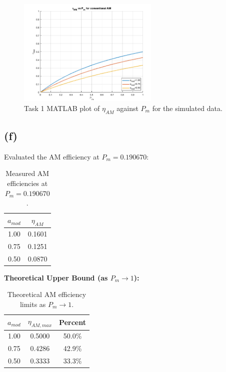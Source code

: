 \documentclass[11pt]{article}
\begin{document}
\begin{figure}[H]
  \centering
  \includegraphics[width=0.6\textwidth]{"task-1 plot.png"}
  \caption{Task 1 MATLAB plot of \(\eta_{AM}\) against \(P_m\) for the simulated data.}
\end{figure}


\subsection*{(f)}
Evaluated the AM efficiency at \( P_m = 0.190670 \):

\begin{table}[H]
\centering
\begin{tabular}{c c}
\hline
\textbf{\(a_{mod}\)} & \textbf{\(\eta_{AM}\)} \\
\hline
1.00 & 0.1601 \\
0.75 & 0.1251 \\
0.50 & 0.0870 \\
\hline
\end{tabular}
\caption{Measured AM efficiencies at \( P_m = 0.190670 \).}
\end{table}

\noindent
\textbf{Theoretical Upper Bound (as \(P_m \to 1\)):}

\begin{table}[H]
\centering
\begin{tabular}{c c c}
\hline
\textbf{\(a_{mod}\)} & \textbf{\(\eta_{AM,max}\)} & \textbf{Percent} \\
\hline
1.00 & 0.5000 & 50.0\% \\
0.75 & 0.4286 & 42.9\% \\
0.50 & 0.3333 & 33.3\% \\
\hline
\end{tabular}
\caption{Theoretical AM efficiency limits as \(P_m \rightarrow 1\).}
\end{table}
\end{document}
